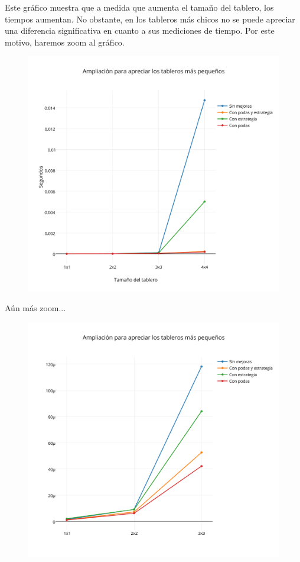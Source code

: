 Este gr\'afico muestra que a medida que aumenta el tama\~no del tablero, los tiempos aumentan. No obstante, en los tableros más chicos no se puede apreciar una diferencia significativa en cuanto a sus mediciones de tiempo. Por este motivo, haremos zoom al gr\'afico.
\newpage
 \begin{figure}[h!]
   \begin{center}
   \includegraphics[scale=0.18]{../src/ej3/Mediciones/vacios/promedios2.png}
   \end{center}
 \end{figure}

A\'un m\'as zoom...

 \begin{figure}[h!]
   \begin{center}
   \includegraphics[scale=0.18]{../src/ej3/Mediciones/vacios/promedios3.png}
   \end{center}
 \end{figure}
\newpage

